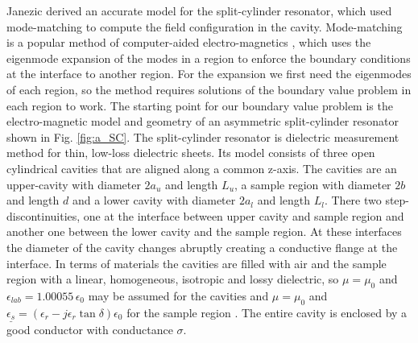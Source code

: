 Janezic \cite{janezic} derived an accurate model for the split-cylinder resonator, which used mode-matching to compute the field configuration in the cavity. Mode-matching is a popular method of computer-aided electro-magnetics \cite{sorrentino, arndt}, which uses the eigenmode expansion of the modes in a region to enforce the boundary conditions at the interface to another region. For the expansion we first need the eigenmodes of each region, so the method requires solutions of the boundary value problem in each region to work. The starting point for our boundary value problem is the electro-magnetic model and geometry of an asymmetric split-cylinder resonator shown in Fig. \ref{fig:a_SC}. The split-cylinder resonator is dielectric measurement method for thin, low-loss dielectric sheets. Its model consists of three open cylindrical cavities that are aligned along a common z-axis. The cavities are an upper-cavity with diameter $2a_u$ and length $L_u$, a sample region with diameter $2b$ and length $d$ and a lower cavity with diameter $2a_l$ and length $L_l$. There two step-discontinuities, one at the interface between upper cavity and sample region and another one between the lower cavity and the sample region. At these interfaces the diameter of the cavity changes abruptly creating a conductive flange at the interface. In terms of materials the cavities are filled with air and the sample region with a linear, homogeneous, isotropic and lossy dielectric, so $\mu=\mu_0$ and $\epsilon_{lab}=1.00055\,\epsilon_0$ may be assumed for the cavities and $\mu=\mu_0$ and $\underline{\epsilon_s}=(\epsilon_r-j\epsilon_r\tan\delta)\epsilon_0$ for the sample region \cite{phillips}. The entire cavity is enclosed by a good conductor with conductance $\sigma$.

